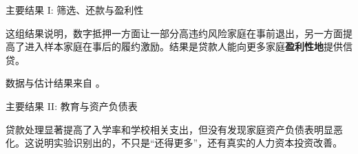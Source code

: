 \begin{frame}{主要结果 I: 筛选、还款与盈利性}
  

  \scriptsize
  这组结果说明，数字抵押一方面让一部分高违约风险家庭在事前退出，另一方面提高了进入样本家庭在事后的履约激励。结果是贷款人能向更多家庭\textbf{盈利性地}提供信贷。

  \medskip
  \scriptsize 数据与估计结果来自 \cite{gertler2024DigitalCollateral}。
\end{frame}

\begin{frame}{主要结果 II: 教育与资产负债表}
  

  \scriptsize
  贷款处理显著提高了入学率和学校相关支出，但没有发现家庭资产负债表明显恶化。这说明实验识别出的，不只是“还得更多”，还有真实的人力资本投资改善。
\end{frame}
